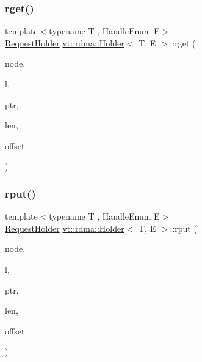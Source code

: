 \subsubsection{\texorpdfstring{rget()}{rget()}}
{\footnotesize\ttfamily template$<$typename T , Handle\+Enum E$>$ \\
\hyperlink{structvt_1_1rdma_1_1_request_holder}{Request\+Holder} \hyperlink{structvt_1_1rdma_1_1_holder}{vt\+::rdma\+::\+Holder}$<$ T, E $>$\+::rget (\begin{DoxyParamCaption}\item[{\hyperlink{namespacevt_a866da9d0efc19c0a1ce79e9e492f47e2}{vt\+::\+Node\+Type}}]{node,  }\item[{\hyperlink{namespacevt_1_1rdma_ac5c20b41a653e520b6305d4d454ecb70}{Lock}}]{l,  }\item[{T $\ast$}]{ptr,  }\item[{std\+::size\+\_\+t}]{len,  }\item[{int}]{offset }\end{DoxyParamCaption})}

\mbox{\label{structvt_1_1rdma_1_1_holder_ae3f9105ec3abe794bd39f24ef55f1c29}} 
\subsubsection{\texorpdfstring{rput()}{rput()}}
{\footnotesize\ttfamily template$<$typename T , Handle\+Enum E$>$ \\
\hyperlink{structvt_1_1rdma_1_1_request_holder}{Request\+Holder} \hyperlink{structvt_1_1rdma_1_1_holder}{vt\+::rdma\+::\+Holder}$<$ T, E $>$\+::rput (\begin{DoxyParamCaption}\item[{\hyperlink{namespacevt_a866da9d0efc19c0a1ce79e9e492f47e2}{vt\+::\+Node\+Type}}]{node,  }\item[{\hyperlink{namespacevt_1_1rdma_ac5c20b41a653e520b6305d4d454ecb70}{Lock}}]{l,  }\item[{T $\ast$}]{ptr,  }\item[{std\+::size\+\_\+t}]{len,  }\item[{int}]{offset }\end{DoxyParamCaption})}

\mbox{\label{structvt_1_1rdma_1_1_holder_a85d338b1beb4c041aa477b18c4eaa312}} 
